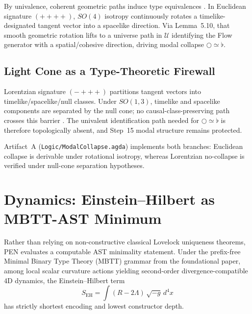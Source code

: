 \documentclass[12pt,a4paper]{article}
\theoremstyle{definition}
\newcommand{\flatmod}{\flat}
\newcommand{\nextmod}{\bigcirc}
\begin{document}
By univalence, coherent geometric paths induce type equivalences \cite{hottbook}. In Euclidean signature $(++++)$, $SO(4)$ isotropy continuously rotates a timelike-designated tangent vector into a spacelike direction. Via Lemma~5.10, that smooth geometric rotation lifts to a universe path in $\mathcal{U}$ identifying the Flow generator with a spatial/cohesive direction, driving modal collapse $\nextmod\simeq\flatmod$.

\subsection{Light Cone as a Type-Theoretic Firewall}

Lorentzian signature $(-+++)$ partitions tangent vectors into timelike/spacelike/null classes. Under $SO(1,3)$, timelike and spacelike components are separated by the null cone; no causal-class-preserving path crosses this barrier \cite{hawking-ellis,wald-gr}. The univalent identification path needed for $\nextmod\simeq\flatmod$ is therefore topologically absent, and Step~15 modal structure remains protected.

Artifact~A (\texttt{Logic/ModalCollapse.agda}) implements both branches: Euclidean collapse is derivable under rotational isotropy, whereas Lorentzian no-collapse is verified under null-cone separation hypotheses.

\begin{center}
\end{center}

\section{Dynamics: Einstein--Hilbert as MBTT-AST Minimum}

Rather than relying on non-constructive classical Lovelock uniqueness theorems, PEN evaluates a computable AST minimality statement. Under the prefix-free Minimal Binary Type Theory (MBTT) grammar from the foundational paper, among local scalar curvature actions yielding second-order divergence-compatible 4D dynamics, the Einstein--Hilbert term
\begin{equation}
S_{\mathrm{EH}} = \int (R - 2\Lambda)\,\sqrt{-g}\,d^4x
\end{equation}
has strictly shortest encoding and lowest constructor depth.
\end{document}
